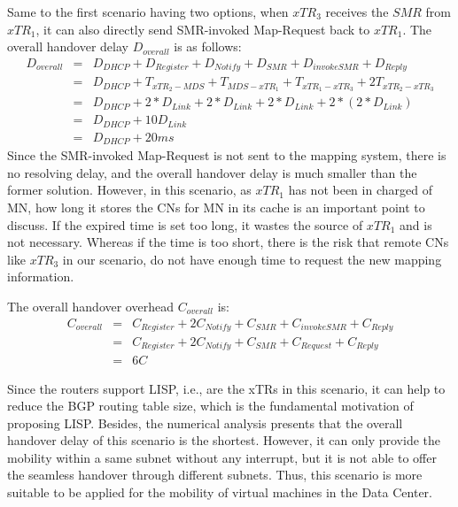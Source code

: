 {Same to the first scenario having two options, when $xTR_3$ receives the $SMR$ from $xTR_1$, it can also directly send SMR-invoked Map-Request back to $xTR_1$. The overall handover delay $D_{overall}$ is as follows:
\begin{eqnarray}
D_{overall} &=& D_{DHCP} + D_{Register} + D_{Notify} + D_{SMR} + D_{invokeSMR} + D_{Reply} \nonumber \\
&=& D_{DHCP} + T_{xTR_2-MDS} + T_{MDS-xTR_1} + T_{xTR_1-xTR_3} + 2T_{xTR_2-xTR_3} \nonumber \\
&=& D_{DHCP} +2*D_{Link} + 2*D_{Link} + 2*D_{Link} + 2*(2*D_{Link}) \nonumber \\
&=& D_{DHCP} + 10D_{Link}  \\
&=& D_{DHCP} + 20 ms \nonumber
\end{eqnarray}
Since the SMR-invoked Map-Request is not sent to the mapping system, there is no resolving delay, and the overall handover delay is much smaller than the former solution. However, in this scenario, as $xTR_1$ has not been in charged of MN, how long it stores the CNs for MN in its cache is an important point to discuss. If the expired time is set too long, it wastes the source of $xTR_1$ and is not necessary. Whereas if the time is too short, there is the risk that remote CNs like $xTR_3$ in our scenario, do not have enough time to request the new mapping information.

The overall handover overhead $C_{overall}$ is:
\begin{eqnarray}
C_{overall} &=& C_{Register} + 2C_{Notify} + C_{SMR} + C_{invokeSMR} + C_{Reply} \nonumber \\
&=& C_{Register} + 2C_{Notify} + C_{SMR} + C_{Request} + C_{Reply} \nonumber \\
&=& 6 C
\end{eqnarray}

Since the routers support LISP, i.e., are the xTRs in this scenario, it can help to reduce the BGP routing table size, which is the fundamental motivation of proposing LISP. Besides, the numerical analysis presents that the overall handover delay of this scenario is the shortest. However, it can only provide the mobility within a same subnet without any interrupt, but it is not able to offer the seamless handover through different subnets. Thus, this scenario is more suitable to be applied for the mobility of virtual machines in the Data Center.

}
